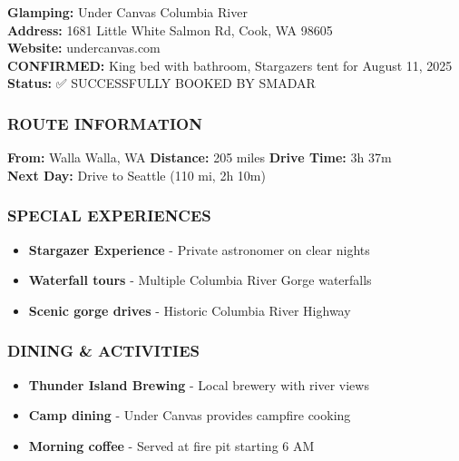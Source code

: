 \documentclass[
  10pt,
]{article}
\providecommand{\tightlist}{%
  \setlength{\itemsep}{0pt}\setlength{\parskip}{0pt}}
\begin{document}
\textbf{\textcolor{secondary}{Glamping:}} Under Canvas Columbia River\\
\textbf{\textcolor{secondary}{Address:}} 1681 Little White Salmon Rd,
Cook, WA 98605\\
\textbf{\textcolor{secondary}{Website:}} undercanvas.com\\
\textbf{\textcolor{primary}{CONFIRMED:}} King bed with bathroom,
Stargazers tent for August 11, 2025\\
\textbf{\textcolor{primary}{Status:}} ✅ SUCCESSFULLY BOOKED BY SMADAR

\subsubsection{\texorpdfstring{\textcolor{primary}{ROUTE INFORMATION}}{}}\label{section-42}

\textbf{\textcolor{secondary}{From:}} Walla Walla, WA \textbar{}
\textbf{\textcolor{secondary}{Distance:}} 205 miles \textbar{}
\textbf{\textcolor{secondary}{Drive Time:}} 3h 37m\\
\textbf{\textcolor{secondary}{Next Day:}} Drive to Seattle (110 mi, 2h
10m)

\subsubsection{\texorpdfstring{\textcolor{primary}{SPECIAL EXPERIENCES}}{}}\label{section-43}

\begin{itemize}
\tightlist
\item
  \textbf{\textcolor{secondary}{Stargazer Experience}} - Private
  astronomer on clear nights
\item
  \textbf{\textcolor{secondary}{Waterfall tours}} - Multiple Columbia
  River Gorge waterfalls\\
\item
  \textbf{\textcolor{secondary}{Scenic gorge drives}} - Historic
  Columbia River Highway
\end{itemize}

\subsubsection{\texorpdfstring{\textcolor{primary}{DINING \& ACTIVITIES}}{}}\label{section-44}

\begin{itemize}
\tightlist
\item
  \textbf{\textcolor{secondary}{Thunder Island Brewing}} - Local brewery
  with river views
\item
  \textbf{\textcolor{secondary}{Camp dining}} - Under Canvas provides
  campfire cooking\\
\item
  \textbf{\textcolor{secondary}{Morning coffee}} - Served at fire pit
  starting 6 AM
\end{itemize}
\end{document}
